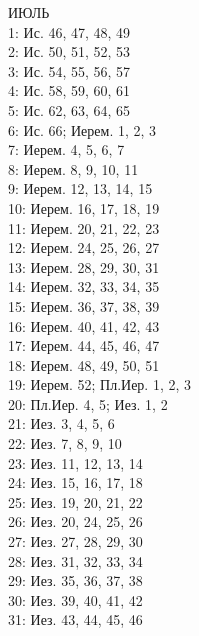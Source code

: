 \documentclass[fontsize=16pt,letterpaper,DIV=6]{scrartcl}
\begin{document}
\begin{multicols}{2}
ИЮЛЬ
\\  1: Ис. 46, 47, 48, 49
\\  2: Ис. 50, 51, 52, 53
\\  3: Ис. 54, 55, 56, 57
\\  4: Ис. 58, 59, 60, 61
\\  5: Ис. 62, 63, 64, 65
\\  6: Ис. 66; Иерем. 1, 2, 3
\\  7: Иерем. 4, 5, 6, 7
\\  8: Иерем. 8, 9, 10, 11
\\  9: Иерем. 12, 13, 14, 15
\\  10: Иерем. 16, 17, 18, 19
\\  11: Иерем. 20, 21, 22, 23
\\  12: Иерем. 24, 25, 26, 27
\\  13: Иерем. 28, 29, 30, 31
\\  14: Иерем. 32, 33, 34, 35
\\  15: Иерем. 36, 37, 38, 39
\\  16: Иерем. 40, 41, 42, 43
\\  17: Иерем. 44, 45, 46, 47
\\  18: Иерем. 48, 49, 50, 51
\\  19: Иерем. 52; Пл.Иер. 1, 2, 3
\\  20: Пл.Иер. 4, 5; Иез. 1, 2
\\  21: Иез. 3, 4, 5, 6
\\  22: Иез. 7, 8, 9, 10
\\  23: Иез. 11, 12, 13, 14
\\  24: Иез. 15, 16, 17, 18
\\  25: Иез. 19, 20, 21, 22
\\  26: Иез. 20, 24, 25, 26
\\  27: Иез. 27, 28, 29, 30
\\  28: Иез. 31, 32, 33, 34
\\  29: Иез. 35, 36, 37, 38
\\  30: Иез. 39, 40, 41, 42
\\  31: Иез. 43, 44, 45, 46


\end{multicols}
\end{document}

